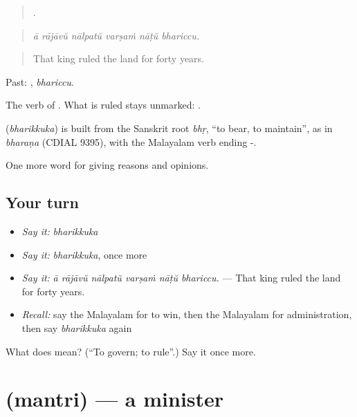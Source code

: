 \begin{quote}
     .
\end{quote}

\begin{quote}
\emph{ā rājāvŭ nālpatŭ varṣaṁ nāṭŭ bhariccu.}
\end{quote}

\begin{quote}
That king ruled the land for forty years.
\end{quote}

Past: , \emph{bhariccu}.

The verb of . What is ruled stays unmarked:  .

\begin{cousinweb}
\textbf{} (\emph{bharikkuka}) is built from the Sanskrit root \emph{bhṛ}, \textquotedblleft{}to bear, to maintain\textquotedblright{}, as in \emph{bharaṇa} (CDIAL 9395), with the Malayalam verb ending -.
\end{cousinweb}

\begin{grammarlens}[title={What you've built}]
One more word for giving reasons and opinions.
\end{grammarlens}

\subsection*{Your turn}
\begin{itemize}
\raggedright
  \item \emph{Say it:} \emph{bharikkuka}
  \item \emph{Say it:} \emph{bharikkuka}, once more
  \item \emph{Say it:} \emph{ā rājāvŭ nālpatŭ varṣaṁ nāṭŭ bhariccu.} — That king ruled the land for forty years.
  \item \emph{Recall:} say the Malayalam for to win, then the Malayalam for administration, then say \emph{bharikkuka} again
\end{itemize}

\begin{tcolorbox}[breakable,colback=teal!4,colframe=teal!35!black,title={Before you move on}]
What does  mean? (\textquotedblleft{}To govern; to rule\textquotedblright{}.) Say it once more.
\end{tcolorbox}
\section[\texorpdfstring{\ml{മന്ത്രി} (mantri)}{മന്ത്രി (mantri)}]{ (mantri) — a minister}


